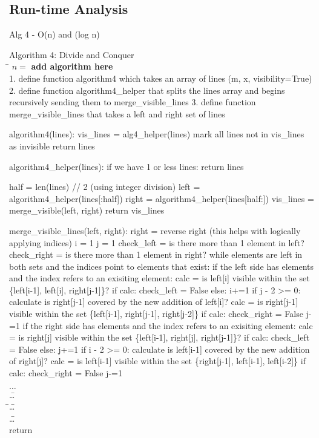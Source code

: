 \documentclass{article}
\begin{document}
\subsection*{Run-time Analysis}

Alg 4 - O(n) and \Omega(log n)

\begin{tabbing}
  {\sc Algorithm 4: Divide and Conquer}\\
  \qquad \= $n = $ \textbf{add algorithm here} \\
  1. define function algorithm4 which takes an array of lines (m, x, visibility=True)
  2. define function algorithm4\_helper that splits the lines array and begins
     recursively sending them to merge\_visible\_lines
  3. define function merge\_visible\_lines that takes a left and right set of lines

  algorithm4(lines):
    vis\_lines = alg4\_helper(lines)
    mark all lines not in vis\_lines as invisible
    return lines

  algorithm4\_helper(lines):
    if we have 1 or less lines:
      return lines

    half = len(lines) // 2 (using integer division)
    left = algorithm4\_helper(lines[:half])
    right = algorithm4\_helper(lines[half:])
    vis\_lines = merge\_visible(left, right)
    return vis\_lines

  merge\_visible\_lines(left, right):
    right = reverse right (this helps with logically applying indices)
    i = 1
    j = 1
    check\_left = is there more than 1 element in left?
    check\_right = is there more than 1 element in right?
    while elements are left in both sets and the indices point to elements that exist:
      if the left side has elements and the index refers to an exisiting element:
        calc = is left[i] visible within the set \{left[i-1], left[i], right[j-1]\}?
        if calc:
          check\_left = False
        else:
          i+=1
          if j - 2 >= 0:
            calculate is right[j-1] covered by the new addition of left[i]?
            calc = is right[j-1] visible within the set \{left[i-1], right[j-1], right[j-2]\}
            if calc:
              check\_right = False
              j-=1
      if the right side has elements and the index refers to an exisiting element:
        calc = is right[j] visible within the set \{left[i-1], right[j], right[j-1]\}?
        if calc:
          check\_left = False
        else:
          j+=1
          if i - 2 >= 0:
            calculate is left[i-1] covered by the new addition of right[j]?
            calc = is left[i-1] visible within the set \{right[j-1], left[i-1], left[i-2]\}
            if calc:
              check\_right = False
              j-=1

  \> $\ldots$ \\
  \> \qquad \= \ldots\\
  \> \qquad \= \qquad \= \ldots\\ 
  \> \qquad \= \ldots\\
  \> return
\end{tabbing}
\end{document}
